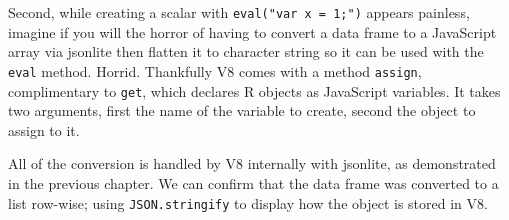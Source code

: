 \documentclass[
]{krantz}
\makeatletter
\newenvironment{Shaded}{\begin{snugshade}}{\end{snugshade}}
\newcommand{\CommentTok}[1]{\textcolor[rgb]{0.37,0.37,0.37}{\textit{#1}}}
\newcommand{\DecValTok}[1]{\textcolor[rgb]{0.06,0.06,0.06}{#1}}
\newcommand{\KeywordTok}[1]{\textcolor[rgb]{0.27,0.27,0.27}{\textbf{#1}}}
\newcommand{\NormalTok}[1]{#1}
\newcommand{\OperatorTok}[1]{\textcolor[rgb]{0.43,0.43,0.43}{\textbf{#1}}}
\newcommand{\StringTok}[1]{\textcolor[rgb]{0.5,0.5,0.5}{#1}}
\newenvironment{kframe}{%
\medskip{}
\setlength{\fboxsep}{.8em}
 \def\at@end@of@kframe{}%
 \ifinner\ifhmode%
  \def\at@end@of@kframe{\end{minipage}}%
  \begin{minipage}{\columnwidth}%
 \fi\fi%
 \def\FrameCommand##1{\hskip\@totalleftmargin \hskip-\fboxsep
 \colorbox{shadecolor}{##1}\hskip-\fboxsep
     \hskip-\linewidth \hskip-\@totalleftmargin \hskip\columnwidth}%
 \MakeFramed {\advance\hsize-\width
   \@totalleftmargin\z@ \linewidth\hsize
   \@setminipage}}%
 {\par\unskip\endMakeFramed%
 \at@end@of@kframe}
\renewenvironment{Shaded}{\begin{kframe}}{\end{kframe}}
\makeatother
\begin{document}
\begin{Shaded}
\end{Shaded}

Second, while creating a scalar with \texttt{eval("var\ x\ =\ 1;")} appears painless, imagine if you will the horror of having to convert a data frame to a JavaScript array via jsonlite then flatten it to character string so it can be used with the \texttt{eval} method. Horrid. Thankfully V8 comes with a method \texttt{assign}, complimentary to \texttt{get}, which declares R objects as JavaScript variables. It takes two arguments, first the name of the variable to create, second the object to assign to it.

\begin{Shaded}
\end{Shaded}

All of the conversion is handled by V8 internally with jsonlite, as demonstrated in the previous chapter. We can confirm that the data frame was converted to a list row-wise; using \texttt{JSON.stringify} to display how the object is stored in V8.

\begin{Shaded}
\end{Shaded}
\end{document}

